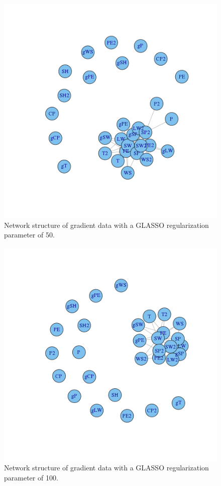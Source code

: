 \documentclass{article}
\begin{document}
\begin{figure}
\includegraphics[width=0.9\columnwidth]{images/grad_50.png}
\caption{Network structure of gradient data with a GLASSO regularization parameter of 50.}
\label{fig:grad_50}
\end{figure}

\begin{figure}
\includegraphics[width=0.9\columnwidth]{images/grad_100.png}
\caption{Network structure of gradient data with a GLASSO regularization parameter of 100.}
\label{fig:grad_100}
\end{figure}
\end{document}
